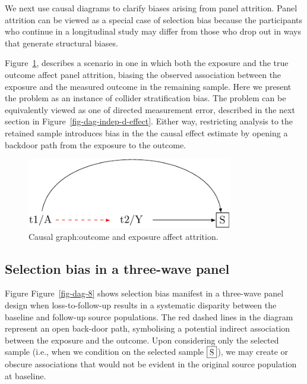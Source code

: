 \documentclass[
  singlecolumn]{report}
\begin{document}
We next use causal diagrams to clarify biases arising from panel
attrition. Panel attrition can be viewed as a special case of selection
bias because the participants who continue in a longitudinal study may
differ from those who drop out in ways that generate structural biases.

Figure~\ref{fig-dag-8-5}, describes a scenario in one in which both the
exposure and the true outcome affect panel attrition, biasing the
observed association between the exposure and the measured outcome in
the remaining sample. Here we present the problem as an instance of
collider stratification bias. The problem can be equivalently viewed as
one of directed measurement error, described in the next section in
Figure~\ref{fig-dag-indep-d-effect}. Either way, restricting analysis to
the retained sample introduces bias in the the causal effect estimate by
opening a backdoor path from the exposure to the outcome.

\begin{figure}

{\centering \includegraphics[width=0.8\textwidth,height=\textheight]{causal-dags_files/figure-pdf/fig-dag-8-5-1.pdf}

}

\caption{\label{fig-dag-8-5}Causal graph:outcome and exposure affect
attrition.}

\end{figure}

\hypertarget{selection-bias-in-a-three-wave-panel}{%
\subsection{Selection bias in a three-wave
panel}\label{selection-bias-in-a-three-wave-panel}}

Figure Figure~\ref{fig-dag-8} shows selection bias manifest in a
three-wave panel design when loss-to-follow-up results in a systematic
disparity between the baseline and follow-up source populations. The red
dashed lines in the diagram represent an open back-door path,
symbolising a potential indirect association between the exposure and
the outcome. Upon considering only the selected sample (i.e., when we
condition on the selected sample \(\framebox{S}\)), we may create or
obscure associations that would not be evident in the original source
population at baseline.
\end{document}
